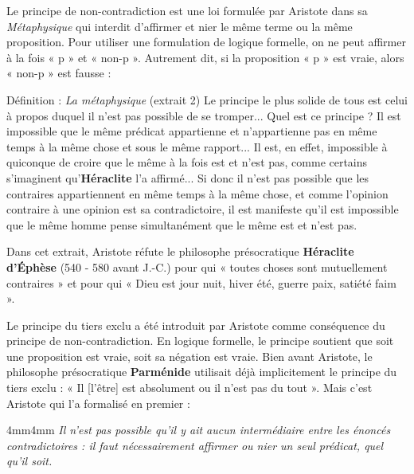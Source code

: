 Le principe de non-contradiction est une loi formulée par Aristote dans sa \textit{Métaphysique} qui interdit d’affirmer et nier le même terme ou la même proposition. Pour utiliser une formulation de logique formelle, on ne peut affirmer à la fois « p » et « non-p ». Autrement dit, si la proposition « p » est vraie, alors « non-p » est fausse :

\begin{lecture}{Définition : \textit{La métaphysique} (extrait 2)}
Le principe le plus solide de tous est celui à propos duquel il n’est pas possible de se tromper... Quel est ce principe ? Il est impossible que le même prédicat appartienne et n’appartienne pas en même temps à la même chose et sous le même rapport... Il est, en effet, impossible à quiconque de croire que le même à la fois est et n’est pas, comme certains s’imaginent qu’\textbf{Héraclite} l’a affirmé... Si donc il n’est pas possible que les contraires appartiennent en même temps à la même chose, et comme l’opinion contraire à une opinion est sa contradictoire, il est manifeste qu’il est impossible que le même homme pense simultanément que le même est et n’est pas.
\end{lecture}

Dans cet extrait, Aristote réfute le philosophe présocratique \textbf{Héraclite d’Éphèse} (540 - 580 avant J.-C.) pour qui « toutes choses sont mutuellement contraires » et pour qui « Dieu est jour nuit, hiver été, guerre paix, satiété faim ».

Le principe du tiers exclu a été introduit par Aristote comme conséquence du principe de non-contradiction. En logique formelle, le principe soutient que soit une proposition est vraie, soit sa négation est vraie. Bien avant Aristote, le philosophe présocratique \textbf{Parménide} utilisait déjà implicitement le principe du tiers exclu : « Il [l’être] est absolument ou il n’est pas du tout ». Mais c’est Aristote qui l’a formalisé en premier :

\begin{adjustwidth}{4mm}{4mm}\small\itshape
Il n’est pas possible qu’il y ait aucun intermédiaire entre les énoncés contradictoires : il faut nécessairement affirmer ou nier un seul prédicat, quel qu’il soit.
\end{adjustwidth}

